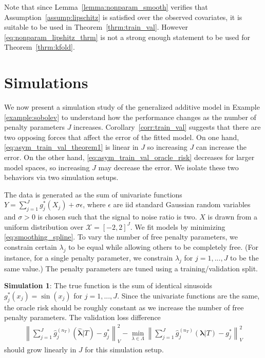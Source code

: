 \documentclass[12pt]{article} %
\theoremstyle{definition}
\begin{document}
Note that since Lemma~\ref{lemma:nonparam_smooth} verifies that Assumption~\ref{assump:lipschitz} is satisfied over the observed covariates, it is suitable to be used in Theorem~\ref{thrm:train_val}.
However \eqref{eq:nonparam_lipshitz_thrm} is not a strong enough statement to be used for Theorem~\ref{thrm:kfold}.
%

\section{Simulations}\label{sec:simulations}

We now present a simulation study of the generalized additive model in Example \ref{example:sobolev} to understand how the performance changes as the number of penalty parameters $J$ increases.
Corollary~\ref{corr:train_val} suggests that there are two opposing forces that affect the error of the fitted model.
On one hand, \eqref{eq:asym_train_val_theorem1} is linear in $J$ so increasing $J$ can increase the error.
On the other hand, \eqref{eq:asym_train_val_oracle_risk} decreases for larger model spaces, so increasing $J$ may decrease the error.
We isolate these two behaviors via two simulation setups.

The data is generated as the sum of univariate functions
$Y = \sum_{j=1}^J g_j^*(X_j) + \sigma \epsilon$,
where $\epsilon$ are iid standard Gaussian random variables and $\sigma > 0$ is chosen such that the signal to noise ratio is two. $X$ is drawn from a uniform distribution over $\mathcal{X} = [-2, 2]^J$.
We fit models by minimizing \eqref{eq:smoothing_spline}.
To vary the number of free penalty parameters, we constrain certain $\lambda_j$ to be equal while allowing others to be completely free.
(For instance, for a single penalty parameter, we constrain $\lambda_j$ for $j=1,...,J$ to be the same value.) 
The penalty parameters are tuned using a training/validation split.

\noindent \textbf{Simulation 1}: The true function is the sum of identical sinusoids
$g_j^*(x_j) = \sin(x_j)$ for $j = 1,...,J$.
Since the univariate functions are the same, the oracle risk should be roughly constant as we increase the number of free penalty parameters.
The validation loss difference
\begin{align}
\left \| \sum_{j=1}^J \hat{g}^{(n_T)}_j(\hat{\boldsymbol{\lambda}}|T) - g^*_j \right \|_V^2 - 
\min_{\lambda \in \Lambda}
\left \| \sum_{j=1}^J \hat{g}^{(n_T)}_j(\boldsymbol{\lambda} | T) - g^*_j \right \|_V^2
\label{eq:excess_risk_sim}
\end{align}
should grow linearly in $J$ for this simulation setup.
\end{document}
